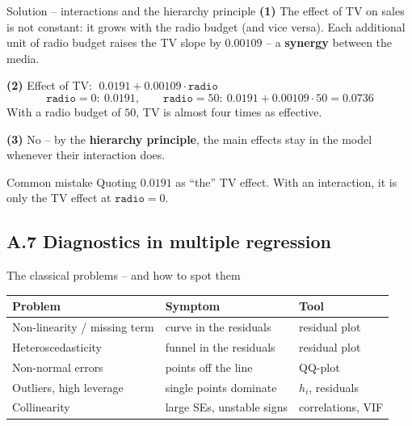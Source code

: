 \documentclass[aspectratio=169,11pt]{beamer}
\begin{document}
\begin{frame}{Solution -- interactions and the hierarchy principle}
  \textbf{(1)} The effect of TV on sales is not constant: it grows with the
  radio budget (and vice versa). Each additional unit of radio budget
  raises the TV slope by $0.00109$ -- a \textbf{synergy} between the media.

  \medskip
  \textbf{(2)} Effect of TV: $\;0.0191+0.00109\cdot\texttt{radio}$
  \[
    \texttt{radio}=0:\ 0.0191,\qquad
    \texttt{radio}=50:\ 0.0191+0.00109\cdot50=0.0736
  \]
  With a radio budget of $50$, TV is almost four times as effective.

  \medskip
  \textbf{(3)} No -- by the \textbf{hierarchy principle}, the main effects
  stay in the model whenever their interaction does.
  \begin{alertblock}{Common mistake}
    Quoting $0.0191$ as ``the'' TV effect. With an interaction, it is only
    the TV effect at $\texttt{radio}=0$.
  \end{alertblock}
\end{frame}

\subsection{A.7 Diagnostics in multiple regression}

\begin{frame}{The classical problems -- and how to spot them}
  \begin{center}
    \renewcommand{\arraystretch}{1.35}
    \begin{tabular}{@{}>{\raggedright\arraybackslash}p{4.2cm}>{\raggedright\arraybackslash}p{4.4cm}>{\raggedright\arraybackslash}p{4.2cm}@{}}
      \toprule
      \textbf{Problem} & \textbf{Symptom} & \textbf{Tool}\\
      \midrule
      Non-linearity / missing term & curve in the residuals & residual plot\\
      Heteroscedasticity & funnel in the residuals & residual plot\\
      Non-normal errors & points off the line & QQ-plot\\
      Outliers, high leverage & single points dominate & $h_i$, residuals\\
      Collinearity & large SEs, unstable signs & correlations, VIF\\
      \bottomrule
    \end{tabular}
  \end{center}
\end{frame}
\end{document}
